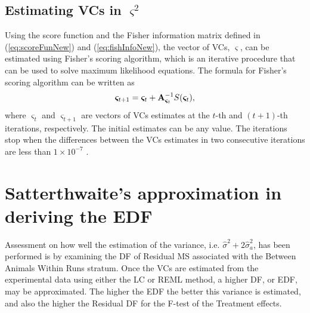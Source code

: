 \subsection{Estimating VCs in {\boldmath $\varsigma^2$}}
Using the score function and the Fisher information matrix defined in (\ref{eq:scoreFunNew}) and (\ref{eq:fishInfoNew}), the vector of VCs, $\bm{\varsigma}$, can be estimated using Fisher's scoring algorithm, which is an iterative procedure that can be used to solve maximum likelihood equations. The formula for Fisher's scoring algorithm can be written as 
\begin{equation}\label{eq:fisherScore}
\bm{\varsigma}_{t+1}= \bm{\varsigma}_t+\mathbf{A}^{-1}_{\bm{\varsigma}_t}S(\bm{\varsigma}_t),
\end{equation}
where $\bm{\varsigma}_{t}$ and $\bm{\varsigma}_{t+1}$ are vectors of VCs estimates at the $t$-th and $(t+1)$-th iterations, respectively. The initial estimates can be any value. The iterations stop when the differences between the VCs estimates in two consecutive iterations are less than $1 \times 10^{-7}$ \citep{Patterson1971}. 



\section{Satterthwaite's approximation in deriving the EDF}
\label{sec:estEDF}
Assessment on how well the estimation of the variance, i.e. $\hat{\sigma}^2+2\hat{\sigma}_{a}^2$, has been performed is by examining the DF of Residual MS associated with the Between Animals Within Runs stratum. Once the VCs are estimated from the experimental data using either the LC or REML method, a higher DF, or EDF, may be approximated. The higher the EDF the better this variance is estimated, and also the higher the Residual DF for the F-test of the Treatment effects. 


